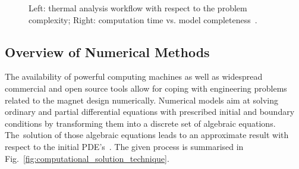 \begin{figure}[H]
  \centering
  \caption{Left: thermal analysis workflow with respect to the problem complexity; Right: computation time vs. model completeness~\cite{steam_architecture_presentation}.}
  \label{fig:model_complexity_vs_completeness}
\end{figure}


\subsection{Overview of Numerical Methods}

The availability of powerful computing machines as well as widespread commercial and open source tools allow for coping with engineering problems related to the magnet design numerically. Numerical models aim at solving ordinary and partial differential equations with prescribed initial and boundary conditions by transforming them into a discrete set of algebraic equations. The~solution of those algebraic equations leads to an approximate result with respect to the initial PDE's~\cite{eth_introduction_to_finite_element}. The given process is summarised in Fig.~\ref{fig:computational_solution_technique}. 


